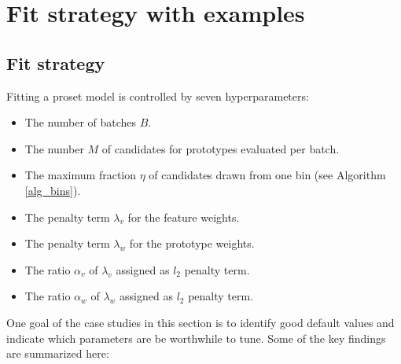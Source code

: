\chapter{Fit strategy with examples}
\label{ch_examples}
%
\section{Fit strategy}
\label{sec_fit_strategy}
%
Fitting a proset model is controlled by seven hyperparameters:
%
\begin{itemize}
\item The number of batches $B$.
%
\item The number $M$ of candidates for prototypes evaluated per batch.
%
\item The maximum fraction $\eta$ of candidates drawn from one bin (see Algorithm \ref{alg_bins}).
%
\item The penalty term $\lambda_v$ for the feature weights.
%
\item The penalty term $\lambda_w$ for the prototype weights.
%
\item The ratio $\alpha_v$ of $\lambda_v$ assigned as $l_2$ penalty term.
%
\item The ratio $\alpha_w$ of $\lambda_w$ assigned as $l_2$ penalty term.
\end{itemize}
%
One goal of the case studies in this section is to identify good default values and indicate which parameters are be worthwhile to tune.
Some of the key findings are summarized here:
%
